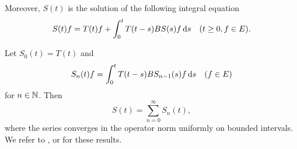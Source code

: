 Moreover, $S(t)$ is the solution of the following integral equation
\begin{equation}\label{eq:a2-1.9}
    S(t)f = T(t)f + \int_{0}^{t} T(t-s)BS(s)f\ds \quad (t \geq 0, f \in E).
\end{equation}

Let $S_{0}(t) = T(t)$ and
\begin{equation}\label{eq:a2-1.10}
    S_{n}(t)f = \int_{0}^{t} T(t-s)BS_{n-1}(s)f\mathop{}\!\mathrm{d}{s} \quad (f \in E)
\end{equation}
for $n \in \mathbb{N}$. Then
\begin{equation}\label{eq:a2-1.11}
    S(t) = \sum_{n=0}^{\infty} S_{n}(t),
\end{equation}
where the series converges in the operator norm uniformly on bounded intervals.
We refer to \textcite[III.1]{davies:1980}, \textcite[I.6]{goldstein:1985a} or \textcite[Chapter 3]{pazy:1983} for these results.

